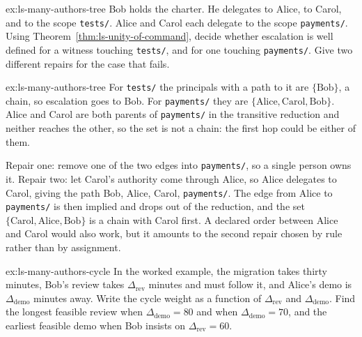 
\begin{pdexercise}[kind=Check,rating=1]{ex:ls-many-authors-tree}
Bob holds the charter. He delegates to Alice, to Carol, and to the scope
\texttt{tests/}. Alice and Carol each delegate to the scope \texttt{payments/}.
Using Theorem~\ref{thm:ls-unity-of-command}, decide whether escalation is well
defined for a witness touching \texttt{tests/}, and for one touching
\texttt{payments/}. Give two different repairs for the case that fails.
\end{pdexercise}
\begin{pdsolution}{ex:ls-many-authors-tree}
For \texttt{tests/} the principals with a path to it are $\{\text{Bob}\}$, a
chain, so escalation goes to Bob. For \texttt{payments/} they are
$\{\text{Alice},\text{Carol},\text{Bob}\}$. Alice and Carol are both parents of
\texttt{payments/} in the transitive reduction and neither reaches the other,
so the set is not a chain: the first hop could be either of them.

Repair one: remove one of the two edges into \texttt{payments/}, so a single
person owns it. Repair two: let Carol's authority come through Alice, so Alice
delegates to Carol, giving the path Bob, Alice, Carol, \texttt{payments/}. The edge from Alice to
\texttt{payments/} is then implied and drops out of the reduction, and the set
$\{\text{Carol},\text{Alice},\text{Bob}\}$ is a chain with Carol first. A
declared order between Alice and Carol would also work, but it amounts to the
second repair chosen by rule rather than by assignment.
\end{pdsolution}
\begin{pdexercise}[kind=Trace,rating=2]{ex:ls-many-authors-cycle}
In the worked example, the migration takes thirty minutes, Bob's review takes
$\Delta_{\mathrm{rev}}$ minutes and must follow it, and Alice's demo is $\Delta_{\mathrm{demo}}$ minutes away. Write the
cycle weight as a function of $\Delta_{\mathrm{rev}}$ and $\Delta_{\mathrm{demo}}$. Find the longest feasible review
when $\Delta_{\mathrm{demo}}=80$ and when $\Delta_{\mathrm{demo}}=70$, and the earliest feasible demo when Bob insists
on $\Delta_{\mathrm{rev}}=60$.
\end{pdexercise}
